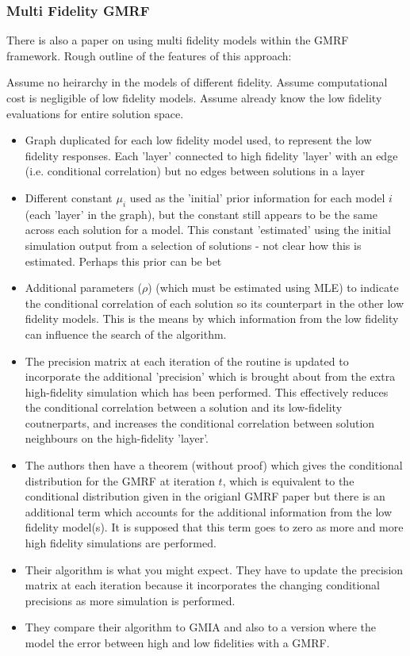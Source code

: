 \documentclass{article}
\begin{document}
\subsubsection{Multi Fidelity GMRF}

There is also a paper on using multi fidelity models within the GMRF framework. Rough outline of the features of this approach:

Assume no heirarchy in the models of different fidelity. Assume computational cost is negligible of low fidelity models. Assume already know the low fidelity evaluations for entire solution space.

\begin{itemize}
\item Graph duplicated for each low fidelity model used, to represent the low fidelity responses. Each 'layer' connected to high fidelity 'layer' with an edge (i.e. conditional correlation) but no edges between solutions in a layer 
\item Different constant $\mu_i$ used as the 'initial' prior information for each model $i$ (each 'layer' in the graph), but the constant still appears to be the same across each solution for a model. This constant 'estimated' using the initial simulation output from a selection of solutions - not clear how this is estimated. Perhaps this prior can be bet
\item Additional parameters ($\rho$) (which must be estimated using MLE) to indicate the conditional correlation of each solution so its counterpart in the other low fidelity models. This is the means by which information from the low fidelity can influence the search of the algorithm.
\item The precision matrix at each iteration of the routine is updated to incorporate the additional 'precision' which is brought about from the extra high-fidelity simulation which has been performed. This effectively reduces the conditional correlation between a solution and its low-fidelity coutnerparts, and increases the conditional correlation between solution neighbours on the high-fidelity 'layer'.
\item The authors then have a theorem (without proof) which gives the conditional distribution for the GMRF at iteration $t$, which is equivalent to the conditional distribution given in the origianl GMRF paper but there is an additional term which accounts for the additional information from the low fidelity model(s). It is supposed that this term goes to zero as more and more high fidelity simulations are performed.
\item Their algorithm is what you might expect. They have to update the precision matrix at each iteration because it incorporates the changing conditional precisions as more simulation is performed.
\item They compare their algorithm to GMIA and also to a version where the model the error between high and low fidelities with a GMRF.
\end{itemize}
\end{document}

